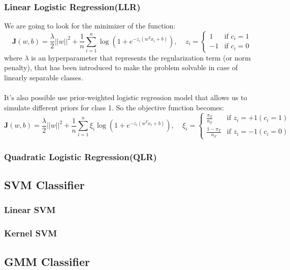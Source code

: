 \documentclass{article}
\begin{document}
\subsubsection{Linear Logistic Regression(LLR)}
We are going to look for the minimizer of the function:
\begin{equation}
    \mathbf{J}(w,b)=\frac{\lambda}{2} ||w||^2 + \frac{1}{n} \sum_{i=1}^{n} \log({1+e^{-z_i(w^Tx_i+b)}}),\;\;\;\;
        z_i = 
        \begin{cases} 
          1 & \text{if } c_i=1 \\
          -1 & \text{if } c_i=0
        \end{cases}
\end{equation}
where \(\lambda\)  is an hyperparameter that represents the regularization term (or norm penalty), that has been introduced to make the problem solvable in case of linearly separable classes.\\
\\
It's also possible use prior-weighted logistic regression model that allows us to simulate different priors for class 1. So the objective function becomes: 
\begin{equation}
    \mathbf{J}(w,b)=\frac{\lambda}{2} ||w||^2 + \frac{1}{n} \sum_{i=1}^{n} \xi_i\log({1+e^{-z_i(w^Tx_i+b)}}),\;\;\;\;
        \xi_i = 
        \begin{cases} 
          \frac{\pi_T}{n_T} & \text{if } z_i=+1 (c_i=1) \\
          \frac{1-\pi_T}{n_F} & \text{if } z_i=-1 (c_i=0)
        \end{cases}
\end{equation}
\subsubsection{Quadratic Logistic Regression(QLR)}
\subsection{SVM Classifier}
\subsubsection{Linear SVM}
\subsubsection{Kernel SVM}
\subsection{GMM Classifier}
\end{document}

